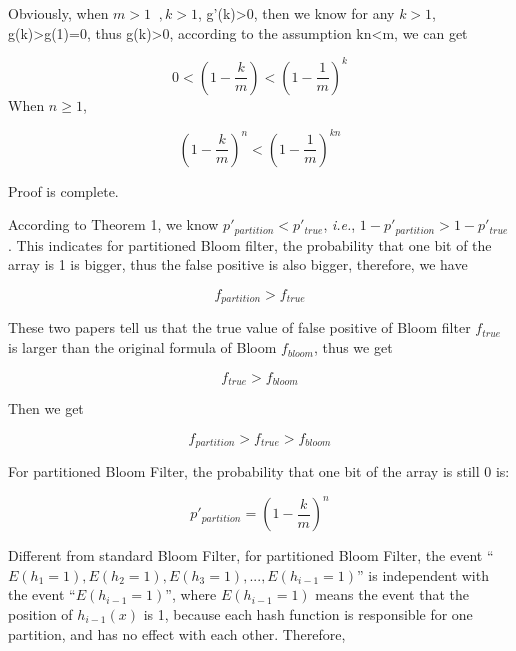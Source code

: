 Obviously, when $m > 1 \;\;,   k > 1 $,
g'(k)>0, then we know for any $k > 1$,
g(k)>g(1)=0, thus g(k)>0, according to the assumption kn<m, we can get

\begin{equation}
0<\left( 1-\dfrac{k}{m} \right)   < 
\left( 1-\dfrac{1}{m} \right)  ^k
\end{equation}
When $n \geq 1$, 

\begin{equation}
\left( 1-\dfrac{k}{m} \right) ^n   < 
\left( 1-\dfrac{1}{m} \right)  ^{kn}
\end{equation}

Proof is complete.

According to Theorem 1, we know $p'_{partition} < p'_{true}$, \textit{i.e.}, $1-p'_{partition} > 1-p'_{true}$. This indicates for partitioned Bloom filter, the probability that one bit of the array is 1 is bigger, thus the false positive is also bigger, therefore, we have


\begin{equation}
f_{partition} > f_{true}
\end{equation}

These two papers tell us that the true value of false positive of Bloom filter $f_{true}$ is larger than the original formula of Bloom $f_{bloom}$, thus we get

\begin{equation}
f_{true} > f_{bloom}
\end{equation}

Then we get

\begin{equation}
\label{bigbig}
f_{partition} > f_{true} > f_{bloom}
\end{equation}

For partitioned Bloom Filter, the probability that one bit of the array is still 0 is:

\begin{equation}
p'_{partition}=\left( 1-\dfrac{k}{m} \right)^n
\end{equation}

Different from standard Bloom Filter, for partitioned Bloom Filter, the event ``$E(h_1=1),E(h_2=1),E(h_3=1),...,E(h_{i-1}=1)$'' is independent with the event ``$E(h_{i-1}=1)$'', where $E(h_{i-1}=1)$ means the event that the position of $h_{i-1}(x)$ is 1, because each hash function is responsible for one partition, and has no effect with each other. Therefore, 


